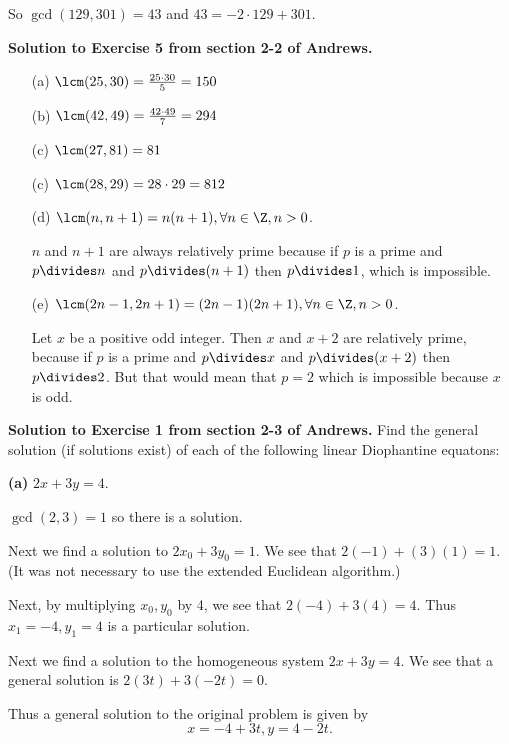 \documentclass[oneside,12pt]{amsart}
\begin{document}
So $\gcd(129,301) = 43$ and $43 = -2\cdot 129 + 301$.


\bigskip

\textbf{Solution to Exercise 5 from section 2-2 of Andrews.} 

\begin{enumerate}
\item[(a)] $\lcm(25,30) = \frac{25\cdot 30}{5} = 150$
\item [(b)] $\lcm(42, 49) = \frac{42\cdot 49}{7} = 294$
\item [(c)] $\lcm(27,81) = 81$
\item [(c)] $\lcm(28,29) = 28\cdot 29 = 812$
\item [(d)] $\lcm(n,n+1) = n(n+1), \forall n\in \Z, n>0$.
\begin{subproof}
$n$ and $n+1$ are always relatively prime because if $p$ is a prime
and $p\divides n$ and $p\divides (n+1)$ then $p\divides 1$, which is
impossible.
\end{subproof}
\item [(e)] $\lcm(2n-1, 2n+1) = (2n-1)(2n+1), \forall n\in \Z, n>0$.
\begin{subproof}
Let $x$ be a positive odd integer. Then $x$ and $x+2$ are relatively prime,
because if $p$ is a prime and $p\divides x$ and $p\divides (x+2)$ then $p\divides 2$.
But that would mean that $p=2$ which is impossible because $x$ is odd.
\end{subproof}
\end{enumerate}

\bigskip

\textbf{Solution to Exercise 1 from section 2-3 of Andrews.} Find the general solution
(if solutions exist) of each of the following linear Diophantine equatons:

\bigskip

\textbf{(a)} $2x + 3y = 4$.

\bigskip 

$\gcd(2,3)=1$ so there is a solution. 

Next we find a solution to $2x_0+3y_0 = 1$. We see that
$2(-1) + (3)(1) = 1$. (It was not necessary to use the extended Euclidean algorithm.)

Next, by multiplying $x_0, y_0$ by 4, we see that $2(-4) + 3(4) = 4$. 
Thus $x_1=-4, y_1=4$ is a particular solution.

Next we find a solution to the homogeneous system $2x+3y=4$. We see that
a general solution is $2(3t) + 3(-2t) = 0$.

Thus a general solution to the original problem is given by
$$x=-4 + 3t, y = 4 - 2t.$$
\end{document}
